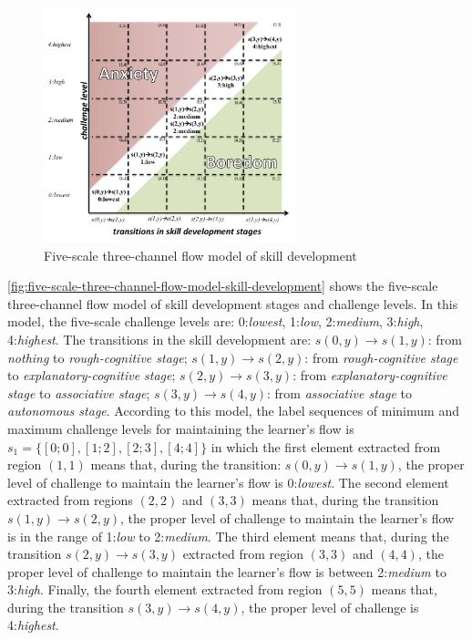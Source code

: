 \begin{figure}[htb]
 \caption{Five-scale three-channel flow model of skill development}
 \label{fig:five-scale-three-channel-flow-model-skill-development}
 \centering
 \includegraphics[width=0.65\textwidth]{images/chap-model-gmif/five-scale-three-channel-flow-model-skill-development.png}
 \fautor
\end{figure}

\autoref{fig:five-scale-three-channel-flow-model-skill-development} shows the five-scale three-channel flow model of skill development stages and challenge levels.
In this model, the five-scale challenge levels are: 0:\emph{lowest}, 1:\emph{low}, 2:\emph{medium}, 3:\emph{high}, 4:\emph{highest}.
The transitions in the skill development are: $s(0,y) \to s(1,y)$: from \emph{nothing} to \emph{rough-cognitive stage};
$s(1,y) \to s(2,y)$: from \emph{rough-cognitive stage} to \emph{explanatory-cognitive stage};
$s(2,y) \to s(3,y)$: from \emph{explanatory-cognitive stage} to \emph{associative stage};
$s(3,y) \to s(4,y)$: from \emph{associative stage} to \emph{autonomous stage}.
According to this model, the label sequences of minimum and maximum challenge levels for maintaining the learner’s flow is $s_{1}=\{[0;0], [1;2], [2;3], [4;4]\}$ in which the first element \aspas{$[0;0]$} extracted from region $(1,1)$ means that, during the transition: $s(0,y) \to s(1,y)$, the proper level of challenge to maintain the learner’s flow is 0:\emph{lowest}.
The second element \aspas{$[1;2]$} extracted from regions $(2,2)$ and $(3,3)$ means that, during the transition $s(1,y) \to s(2,y)$, the proper level of challenge to maintain the learner’s flow is in the range of 1:\emph{low} to 2:\emph{medium}. The third element \aspas{$[2;3]$} means that, during the transition $s(2,y) \to s(3,y)$ extracted from region $(3,3)$ and $(4,4)$, the proper level of challenge to maintain the learner’s flow is between 2:\emph{medium} to 3:\emph{high}.
Finally, the fourth element \aspas{$[4;4]$} extracted from region $(5,5)$ means that, during the transition $s(3,y) \to s(4,y)$, the proper level of challenge is 4:\emph{highest}.

